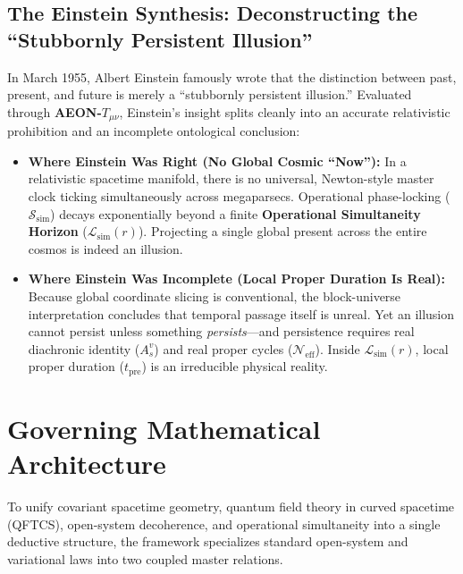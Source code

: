 \documentclass[11pt,a4paper]{article}
\begin{document}
\subsection{The Einstein Synthesis: Deconstructing the ``Stubbornly Persistent Illusion''}
In March 1955, Albert Einstein famously wrote that the distinction between past, present, and future is merely a ``stubbornly persistent illusion.'' Evaluated through \textbf{AEON-$T_{\mu\nu}$}, Einstein's insight splits cleanly into an accurate relativistic prohibition and an incomplete ontological conclusion:
\begin{itemize}[leftmargin=1.5em]
    \item \textbf{Where Einstein Was Right (No Global Cosmic ``Now''):} In a relativistic spacetime manifold, there is no universal, Newton-style master clock ticking simultaneously across megaparsecs. Operational phase-locking ($\mathcal{S}_{\text{sim}}$) decays exponentially beyond a finite \textbf{Operational Simultaneity Horizon} ($\mathcal{L}_{\text{sim}}(r)$). Projecting a single global present across the entire cosmos is indeed an illusion.
    \item \textbf{Where Einstein Was Incomplete (Local Proper Duration Is Real):} Because global coordinate slicing is conventional, the block-universe interpretation concludes that temporal passage itself is unreal. Yet an illusion cannot persist unless something \textit{persists}---and persistence requires real diachronic identity ($A_s^v$) and real proper cycles ($\mathcal{N}_{\text{eff}}$). Inside $\mathcal{L}_{\text{sim}}(r)$, local proper duration ($t_{\text{pre}}$) is an irreducible physical reality.
\end{itemize}

\section{Governing Mathematical Architecture}

To unify covariant spacetime geometry, quantum field theory in curved spacetime (QFTCS), open-system decoherence, and operational simultaneity into a single deductive structure, the framework specializes standard open-system and variational laws into two coupled master relations.
\end{document}
